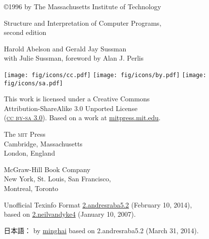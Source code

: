 \documentclass[8pt,oneside]{book}
\newcommand{\acronym}[1]{\textsc{\MakeLowercase{#1}}}
\begin{document}



\frontmatter



\pagebreak

\vspace*{\fill}
\thispagestyle{empty}

\begin{small}

\noindent
{\copyright}1996 by The Massachusetts Institute of Technology

\vspace{1.26em}
\noindent
Structure and Interpretation of Computer Programs,\\
second edition

\vspace{1.26em}
\noindent
Harold Abelson and Gerald Jay Sussman\\
with Julie Sussman, foreword by Alan J. Perlis

\vspace{1.6em}
\noindent
\texttt{[image: fig/icons/cc.pdf]}
\texttt{[image: fig/icons/by.pdf]}
\texttt{[image: fig/icons/sa.pdf]}

\vspace{0.4em}
\noindent
This work is licensed under a Creative Commons\\ 
Attribution-ShareAlike 3.0 Unported License\\
(\href{http://creativecommons.org/licenses/by-sa/3.0/}{\acronym{CC BY-SA} 3.0}).
Based on a work at \href{http://mitpress.mit.edu/sicp/}{mitpress.mit.edu}.

\vspace{1.26em}
\noindent
The \acronym{MIT} Press\\
Cambridge, Massachusetts\\ 
London, England

\vspace{1.26em}
\noindent
McGraw-Hill Book Company\\
New York, St. Louis, San Francisco,\\ 
Montreal, Toronto

\vspace{1.26em}
\noindent
Unofficial Texinfo Format \href{http://sicpebook.wordpress.com}{2.andresraba5.2} (February 10, 2014),\\ 
based on \href{http://www.neilvandyke.org/sicp-texi/}{2.neilvandyke4} (January 10, 2007).

\vspace{1.26em}
\noindent
日本語： by \href{http://d.hatena.ne.jp/minghai/}{minghai} based on 2.andresraba5.2 (March 31, 2014).

\end{small}
\end{document}
